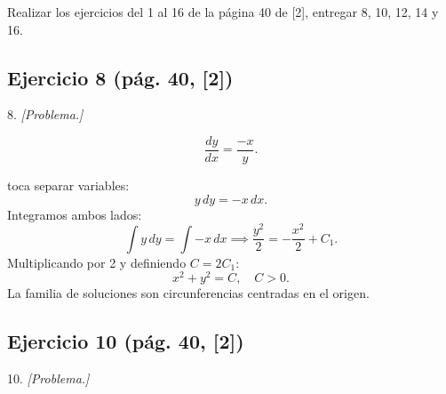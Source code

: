 










\newpage


 Realizar los ejercicios del 1 al 16 de la página 40 de [2], entregar
8, 10, 12, 14 y 16.

\subsection*{Ejercicio 8 \quad\normalfont\small(pág. 40, [2])}

\begin{enunciado}{8.}
    \textit{[Problema.]}
\end{enunciado}

\begin{respuesta}
\[
  \frac{dy}{dx} = \frac{-x}{y}.
\]

toca separar variables:
\[
  y\,dy = -x\,dx.
\]
Integramos ambos lados:
\[
  \int y\,dy = \int -x\,dx
  \implies
  \frac{y^2}{2} = -\frac{x^2}{2} + C_1.
\]
Multiplicando por 2 y definiendo $C = 2C_1$:
\[
  \boxed{x^2 + y^2 = C,\quad C > 0.}
\]
La familia de soluciones son circunferencias centradas en el origen.
    \vspace{7cm}
\end{respuesta}

\subsection*{Ejercicio 10 \quad\normalfont\small(pág. 40, [2])}

\begin{enunciado}{10.}
    \textit{[Problema.]}
\end{enunciado}

